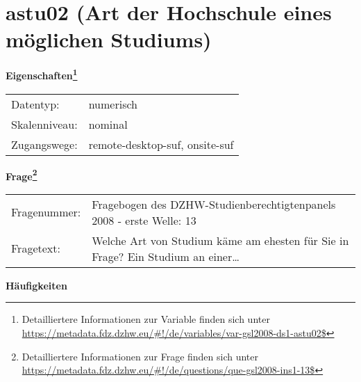 
    \setcounter{footnote}{0}

    \vspace*{-1.8cm}
	\section{astu02 (Art der Hochschule eines möglichen Studiums)}
	\label{section:astu02}



    \vspace*{0.5cm}
    \noindent\textbf{Eigenschaften\footnote{Detailliertere Informationen zur Variable finden sich unter
		\url{https://metadata.fdz.dzhw.eu/\#!/de/variables/var-gsl2008-ds1-astu02$}}}\\
	\begin{tabularx}{\hsize}{@{}lX}
	Datentyp: & numerisch \\
	Skalenniveau: & nominal \\
	Zugangswege: &
	  remote-desktop-suf, 
	  onsite-suf
 \\
    \end{tabularx}



				\vspace*{0.5cm}
                \noindent\textbf{Frage\footnote{Detailliertere Informationen zur Frage finden sich unter
		              \url{https://metadata.fdz.dzhw.eu/\#!/de/questions/que-gsl2008-ins1-13$}}}\\
				\begin{tabularx}{\hsize}{@{}lX}
					Fragenummer: &
					  Fragebogen des DZHW-Studienberechtigtenpanels 2008 - erste Welle:
					  13
 \\
					Fragetext: & Welche Art von Studium käme am ehesten für Sie in Frage? Ein Studium an einer… \\
				\end{tabularx}





        		\vspace*{0.5cm}
                \noindent\textbf{Häufigkeiten}

